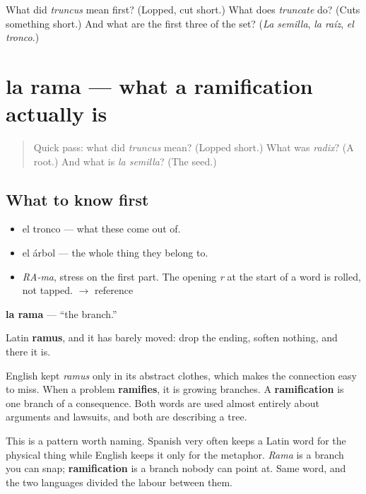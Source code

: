 \begin{tcolorbox}[breakable,colback=teal!4,colframe=teal!35!black,title={Before you move on}]
What did \emph{truncus} mean first? (Lopped, cut short.) What does \emph{truncate} do? (Cuts something short.) And what are the first three of the set? (\emph{La semilla}, \emph{la raíz}, \emph{el tronco}.)
\end{tcolorbox}
\section[la rama]{la rama — what a ramification actually is}

\label{lesson:ES-C291-rama}



\begin{quote}
Quick pass: what did \emph{truncus} mean? (Lopped short.) What was \emph{radix}? (A root.) And what is \emph{la semilla}? (The seed.)
\end{quote}

\subsection*{What to know first}
\begin{itemize}
\raggedright
  \item el tronco — what these come out of.
  \item el árbol — the whole thing they belong to.
\end{itemize}

\begin{sounds}
\begin{itemize}
\raggedright
  \item \emph{RA-ma}, stress on the first part. The opening \emph{r} at the start of a word is rolled, not tapped. $\to$ reference
\end{itemize}
\end{sounds}

\begin{cousinweb}
\textbf{la rama} — \textquotedblleft{}the branch.\textquotedblright{}

Latin \textbf{ramus}, and it has barely moved: drop the ending, soften nothing, and there it is.

English kept \emph{ramus} only in its abstract clothes, which makes the connection easy to miss. When a problem \textbf{ramifies}, it is growing branches. A \textbf{ramification} is one branch of a consequence. Both words are used almost entirely about arguments and lawsuits, and both are describing a tree.

This is a pattern worth naming. Spanish very often keeps a Latin word for the physical thing while English keeps it only for the metaphor. \emph{Rama} is a branch you can snap; \textbf{ramification} is a branch nobody can point at. Same word, and the two languages divided the labour between them.
\end{cousinweb}

